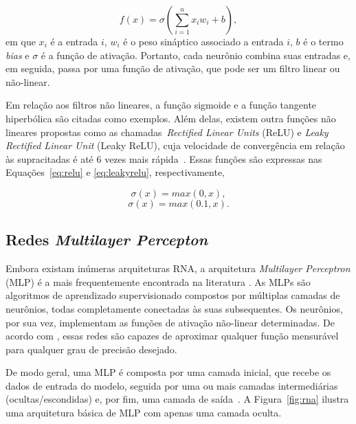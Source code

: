 \begin{equation}
\label{eq:neuronio-artificial}
f(x) = \sigma \left(\sum^n_{i=1}x_iw_i + b \right),
\end{equation}
em que $x_i$ é a entrada $i$, $w_i$ é o peso sináptico associado a entrada $i$, $b$ é o termo \textit{bias} e $\sigma$ é a função de ativação. Portanto, cada neurônio combina suas entradas e, em seguida, passa por uma função de ativação, que pode ser um filtro linear ou não-linear.

Em relação aos filtros não lineares, a função sigmoide e a função tangente hiperbólica são citadas como exemplos. Além delas, existem outra funções não lineares propostas como as chamadas~\textit{Rectified Linear Units} (ReLU) e \textit{Leaky Rectified Linear Unit} (Leaky ReLU), cuja velocidade de convergência em relação às supracitadas é até 6 vezes mais rápida~\cite{krizhevsky2012imagenet, maas2013rectifier}. Essas funções são expressas nas Equações~\ref{eq:relu} e \ref{eq:leakyrelu}, respectivamente,

\begin{equation}
\label{eq:relu}
\sigma(x) = max(0,x),
\end{equation}
\begin{equation}
\label{eq:leakyrelu}
\sigma(x) = max(0.1,x).
\end{equation}

\subsection{Redes \textit{Multilayer Percepton}}
\label{sec:redes-multilayer-percepton}

Embora existam inúmeras arquiteturas RNA, a arquitetura \textit{Multilayer Perceptron} (MLP) é a mais frequentemente encontrada na literatura \cite{PHAM2019302}. As MLPs são algoritmos de aprendizado supervisionado compostos por múltiplas camadas de neurônios, todas completamente conectadas às suas subsequentes. Os neurônios, por sua vez, implementam as funções de ativação não-linear determinadas. De acordo com , essas redes são capazes de aproximar qualquer função mensurável para qualquer grau de precisão desejado.

De modo geral, uma MLP é composta por uma camada inicial, que recebe os dados de entrada do modelo, seguida por uma ou mais camadas intermediárias (ocultas/escondidas) e, por fim, uma camada de saída~\cite{hornik1989multilayer}. A Figura~\ref{fig:rna} ilustra uma arquitetura básica de MLP com apenas uma camada oculta.


